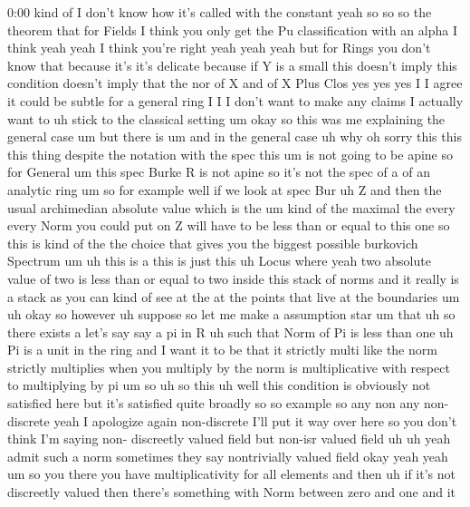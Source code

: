 \begin{unfinished}{0:00}
kind  of  I  don't  know  how  it's  called
with  the  constant  yeah  so  so  so  the
theorem  that  for  Fields  I
think  you  only  get  the  Pu  classification
with  an  alpha  I  think  yeah  yeah  I  think
you're  right  yeah  yeah  yeah  but  for
Rings  you  don't  know  that
because  it's  it's  delicate  because  if  Y
is  a  small  this  doesn't  imply  this
condition  doesn't  imply  that  the  nor  of
X  and  of  X  Plus  Clos  yes  yes  yes  I  I
agree  it  could  be  subtle  for  a  general
ring  I  I  I  don't  want  to  make  any  claims
I  actually  want  to  uh  stick  to  the
classical
setting  um  okay  so  this  was  me
explaining  the  general  case  um  but  there
is  um  and  in  the  general  case  uh  why  oh
sorry  this  this  this  thing  despite  the
notation  with  the  spec  this  um  is  not
going  to  be  apine  so  for
General  um  this
spec
Burke  R  is  not  apine  so  it's  not  the
spec  of  a  of  an  analytic  ring  um  so  for
example  well  if  we  look  at  spec  Bur
uh  Z  and  then  the  usual  archimedian
absolute  value  which  is  the  um  kind  of
the
maximal
the  every  every  Norm  you  could  put  on  Z
will  have  to  be  less  than  or  equal  to
this  one  so  this  is  kind  of  the  the
choice  that  gives  you  the  biggest
possible  burkovich
Spectrum  um  uh  this  is  a  this  is  just
this  uh  Locus  where  yeah  two  absolute
value  of  two  is  less  than  or  equal  to
two  inside  this  stack  of  norms  and  it
really  is  a  stack  as  you  can  kind  of  see
at  the  at  the  points  that  live  at  the
boundaries
um  uh  okay  so
however  uh
suppose  so  let  me  make  a  assumption  star
um  that  uh  so  there  exists  a  let's  say
say  a  pi  in
R  uh  such  that  Norm  of  Pi  is  less  than
one  uh  Pi  is  a
unit  in  the  ring  and  I  want  it  to  be
that  it  strictly  multi  like  the  norm
strictly  multiplies  when  you  multiply  by
the  norm  is  multiplicative  with  respect
to  multiplying  by
pi  um
so
uh  so  this  uh  well  this  condition  is
obviously  not  satisfied  here  but  it's
satisfied  quite  broadly  so  so  example  so
any  non  any  non-discrete
yeah  I  apologize  again  non-discrete  I'll
put  it  way  over  here  so  you  don't  think
I'm  saying  non-  discreetly  valued  field
but
non-isr  valued  field
uh  uh  yeah  admit  such  a
norm  sometimes  they  say  nontrivially
valued  field  okay  yeah  yeah  um  so  you
there  you  have  multiplicativity  for  all
elements  and  then  uh  if  it's  not
discreetly  valued  then  there's  something
with  Norm  between  zero  and  one  and  it

\end{unfinished}
